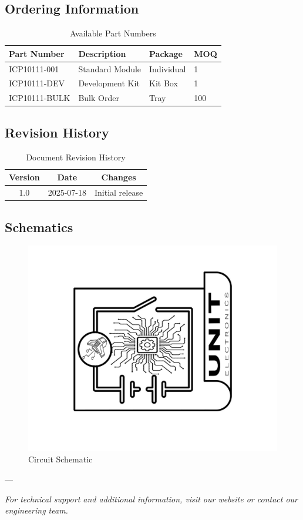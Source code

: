 \documentclass[11pt,a4paper]{article}
\begin{document}
\subsection{Ordering Information}


\begin{table}[H]
\centering
\small
\begin{tabular}{|l|l|l|l|}
\hline
Part Number & Description & Package & MOQ \\
\hline
ICP10111-001 & Standard Module & Individual & 1 \\
ICP10111-DEV & Development Kit & Kit Box & 1 \\
ICP10111-BULK & Bulk Order & Tray & 100 \\
\hline
\end{tabular}
\caption{Available Part Numbers}
\end{table}


\subsection{Revision History}


\begin{table}[H]
\centering
\small
\begin{tabular}{|c|c|c|}
\hline
Version & Date & Changes \\
\hline
1.0 & 2025-07-18 & Initial release \\
\hline
\end{tabular}
\caption{Document Revision History}
\end{table}


\subsection{Schematics}


\begin{figure}[H]
\centering
\includegraphics[width=\textwidth]{en_Schematics_icon.jpg}
\caption{Circuit Schematic}
\label{fig:en-Schematics-icon-jpg}
\end{figure}



---

\textit{For technical support and additional information, visit our website or contact our engineering team.}
\end{document}
